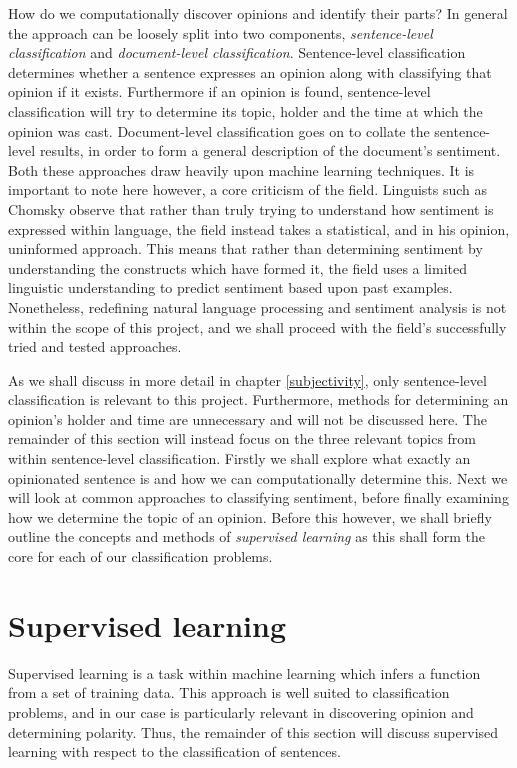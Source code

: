 How do we computationally discover opinions and identify their parts? In general the approach can be loosely split into two components, \emph{sentence-level classification} and \emph{document-level classification}. Sentence-level classification determines whether a sentence expresses an opinion along with classifying that opinion if it exists. Furthermore if an opinion is found, sentence-level classification will try to determine its topic, holder and the time at which the opinion was cast. Document-level classification goes on to collate the sentence-level results, in order to form a general description of the document's sentiment. Both these approaches draw heavily upon machine learning techniques. It is important to note here however, a core criticism of the field. Linguists such as Chomsky \cite{norvig} observe that rather than truly trying to understand how sentiment is expressed within language, the field instead takes a statistical, and in his opinion, uninformed approach. This means that rather than determining sentiment by understanding the constructs which have formed it, the field uses a limited linguistic understanding to predict sentiment based upon past examples. Nonetheless, redefining natural language processing and sentiment analysis is not within the scope of this project, and we shall proceed with the field's successfully tried and tested approaches.

As we shall discuss in more detail in chapter \ref{subjectivity}, only sentence-level classification is relevant to this project. Furthermore, methods for determining an opinion's holder and time are unnecessary and will not be discussed here. The remainder of this section will instead focus on the three relevant topics from within sentence-level classification. Firstly we shall explore what exactly an opinionated sentence is and how we can computationally determine this. Next we will look at common approaches to classifying sentiment, before finally examining how we determine the topic of an opinion. Before this however, we shall briefly outline the concepts and methods of \emph{supervised learning} as this shall form the core for each of our classification problems.

\section{Supervised learning}
\label{background:supervised_learning}

Supervised learning is a task within machine learning which infers a function from a set of training data. This approach is well suited to classification problems, and in our case is particularly relevant in discovering opinion and determining polarity. Thus, the remainder of this section will discuss supervised learning with respect to the classification of sentences. 

